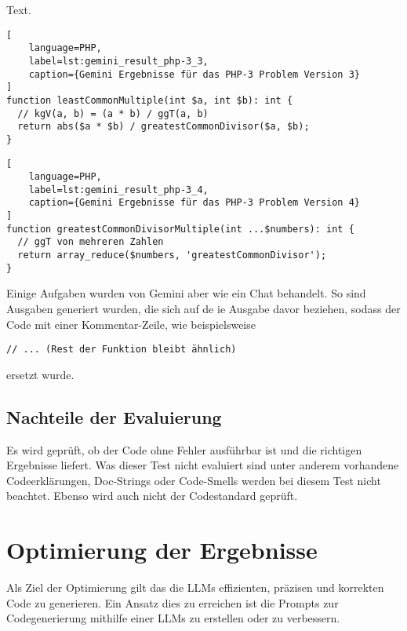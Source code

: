Text.

\begin{lstlisting}[
	language=PHP,
	label=lst:gemini_result_php-3_3,
	caption={Gemini Ergebnisse für das PHP-3 Problem Version 3}
]
function leastCommonMultiple(int $a, int $b): int {
  // kgV(a, b) = (a * b) / ggT(a, b)
  return abs($a * $b) / greatestCommonDivisor($a, $b);
}
\end{lstlisting}

\begin{lstlisting}[
	language=PHP,
	label=lst:gemini_result_php-3_4,
	caption={Gemini Ergebnisse für das PHP-3 Problem Version 4}
]
function greatestCommonDivisorMultiple(int ...$numbers): int {
  // ggT von mehreren Zahlen
  return array_reduce($numbers, 'greatestCommonDivisor');
}
\end{lstlisting}

Einige Aufgaben wurden von Gemini aber wie ein Chat behandelt. So sind Ausgaben generiert wurden, die sich auf de
ie Ausgabe davor beziehen, sodass der Code mit einer Kommentar-Zeile, wie beispielsweise

\texttt{// ... (Rest der Funktion bleibt ähnlich)}

ersetzt wurde.

\subsection{Nachteile der Evaluierung}
Es wird geprüft, ob der Code ohne Fehler ausführbar ist und die richtigen Ergebnisse liefert. Was dieser Test nicht evaluiert sind unter anderem vorhandene Codeerklärungen, Doc-Strings oder Code-Smells werden bei diesem Test nicht beachtet. Ebenso wird auch nicht der Codestandard geprüft.\vspace{0.2cm}




\section{Optimierung der Ergebnisse}
Als Ziel der Optimierung gilt das die LLMs effizienten, präzisen und korrekten Code zu generieren. Ein Ansatz dies zu erreichen ist die Prompts zur Codegenerierung mithilfe einer LLMs zu erstellen oder zu verbessern.




